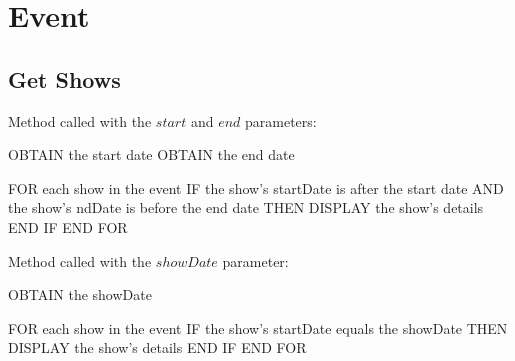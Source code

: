 \section{Event}

\subsection{Get Shows}
Method called with the $start$ and $end$ parameters:
\begin{pc}
OBTAIN the start date
OBTAIN the end date

FOR each show in the event
    IF the show's startDate is after the start date AND the show's ndDate is before the end date    THEN
        DISPLAY the show's details
    END IF
END FOR
\end{pc}

Method called with the $showDate$ parameter:
\begin{pc}
OBTAIN the showDate

FOR each show in the event
    IF the show's startDate equals the showDate THEN
	    DISPLAY the show's details
    END IF
END FOR
\end{pc}
